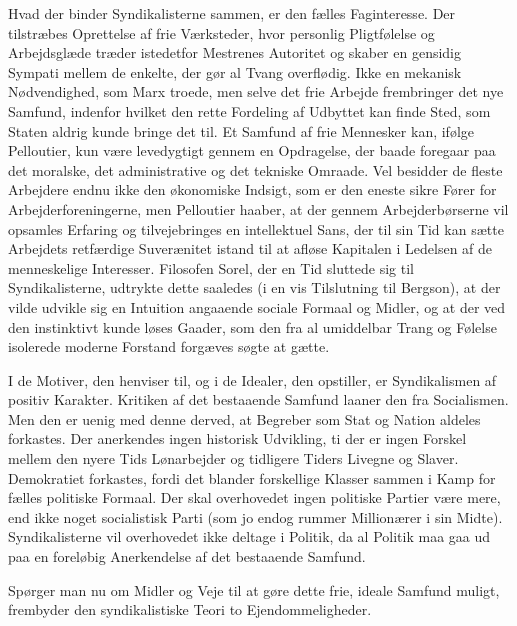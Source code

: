 \documentclass[12pt,a4paper,openany]{book}
\newcommand{\opage}[1]{\marginnote{\footnotesize\textit{[#1]}}}
\begin{document}
Hvad der binder Syndikalisterne sammen, er den fælles Faginteresse.
Der tilstræbes Oprettelse af frie Værksteder, hvor personlig
Pligtfølelse og Arbejdsglæde træder istedetfor Mestrenes Autoritet
og skaber en gensidig Sympati mellem de enkelte, der gør al Tvang
overflødig. Ikke en mekanisk Nødvendighed, som Marx troede, men
selve det frie Arbejde frembringer det nye Samfund, indenfor hvilket
den rette Fordeling af Udbyttet kan finde Sted, som Staten aldrig
kunde bringe det til. Et Samfund af frie Mennesker kan, ifølge
Pelloutier, kun være levedygtigt gennem en Opdragelse, der baade
foregaar paa det moralske, det administrative og det tekniske Omraade.
Vel besidder de fleste Arbejdere endnu ikke den økonomiske
Indsigt, som er den eneste sikre Fører for Arbejderforeningerne,
men Pelloutier haaber, at der gennem Arbejderbørserne vil opsamles
Erfaring og tilvejebringes en intellektuel Sans, der til sin Tid
kan sætte Arbejdets retfærdige Suverænitet istand til at afløse Kapitalen
i Ledelsen af de menneskelige Interesser. Filosofen Sorel, der
en Tid sluttede sig til Syndikalisterne, udtrykte dette saaledes (i en
vis Tilslutning til Bergson), at der vilde udvikle sig en Intuition angaaende
sociale Formaal og Midler, og at der ved den instinktivt
\opage{99}kunde løses Gaader, som den fra al umiddelbar Trang og Følelse
isolerede moderne Forstand forgæves søgte at gætte.

I de Motiver, den henviser til, og i de Idealer, den opstiller, er
Syndikalismen af positiv Karakter. Kritiken af det bestaaende Samfund
laaner den fra Socialismen. Men den er uenig med denne derved,
at Begreber som Stat og Nation aldeles forkastes. Der anerkendes
ingen historisk Udvikling, ti der er ingen Forskel mellem den
nyere Tids Lønarbejder og tidligere Tiders Livegne og Slaver. Demokratiet
forkastes, fordi det blander forskellige Klasser sammen
i Kamp for fælles politiske Formaal. Der skal overhovedet ingen
politiske Partier være mere, end ikke noget socialistisk Parti (som
jo endog rummer Millionærer i sin Midte). Syndikalisterne vil overhovedet
ikke deltage i Politik, da al Politik maa gaa ud paa en foreløbig
Anerkendelse af det bestaaende Samfund.

Spørger man nu om Midler og Veje til at gøre dette frie, ideale
Samfund muligt, frembyder den syndikalistiske Teori to Ejendommeligheder.
\end{document}
